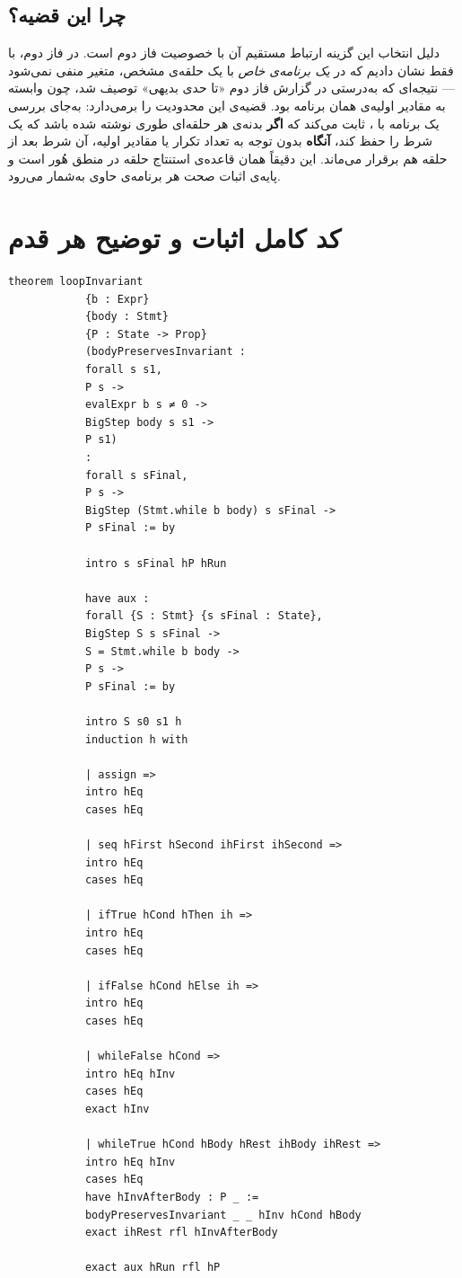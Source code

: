 \documentclass[12pt]{report}
\begin{document}
	\subsection{چرا این قضیه؟}
	دلیل انتخاب این گزینه ارتباط مستقیم آن با خصوصیت  فاز دوم است. در فاز دوم، با  فقط نشان دادیم که در \emph{یک برنامه‌ی خاص} با یک حلقه‌ی مشخص، متغیر  منفی نمی‌شود --- نتیجه‌ای که به‌درستی در گزارش فاز دوم «تا حدی بدیهی» توصیف شد، چون وابسته به مقادیر اولیه‌ی همان برنامه بود. قضیه‌ی  این محدودیت را برمی‌دارد: به‌جای بررسی یک برنامه با ، ثابت می‌کند که \textbf{اگر} بدنه‌ی هر حلقه‌ای طوری نوشته شده باشد که یک شرط را حفظ کند، \textbf{آنگاه} بدون توجه به تعداد تکرار یا مقادیر اولیه، آن شرط بعد از حلقه هم برقرار می‌ماند. این دقیقاً همان قاعده‌ی استنتاج حلقه در منطق هُور است و پایه‌ی اثبات صحت هر برنامه‌ی حاوی  به‌شمار می‌رود.
	
	\section{کد کامل اثبات و توضیح هر قدم}
	
	\begin{latin}
		\begin{lstlisting}[style=leanstyle]
			theorem loopInvariant
			{b : Expr}
			{body : Stmt}
			{P : State -> Prop}
			(bodyPreservesInvariant :
			forall s s1,
			P s ->
			evalExpr b s ≠ 0 ->
			BigStep body s s1 ->
			P s1)
			:
			forall s sFinal,
			P s ->
			BigStep (Stmt.while b body) s sFinal ->
			P sFinal := by
			
			intro s sFinal hP hRun
			
			have aux :
			forall {S : Stmt} {s sFinal : State},
			BigStep S s sFinal ->
			S = Stmt.while b body ->
			P s ->
			P sFinal := by
			
			intro S s0 s1 h
			induction h with
			
			| assign =>
			intro hEq
			cases hEq
			
			| seq hFirst hSecond ihFirst ihSecond =>
			intro hEq
			cases hEq
			
			| ifTrue hCond hThen ih =>
			intro hEq
			cases hEq
			
			| ifFalse hCond hElse ih =>
			intro hEq
			cases hEq
			
			| whileFalse hCond =>
			intro hEq hInv
			cases hEq
			exact hInv
			
			| whileTrue hCond hBody hRest ihBody ihRest =>
			intro hEq hInv
			cases hEq
			have hInvAfterBody : P _ :=
			bodyPreservesInvariant _ _ hInv hCond hBody
			exact ihRest rfl hInvAfterBody
			
			exact aux hRun rfl hP
		\end{lstlisting}
	\end{latin}
	
\end{document}
